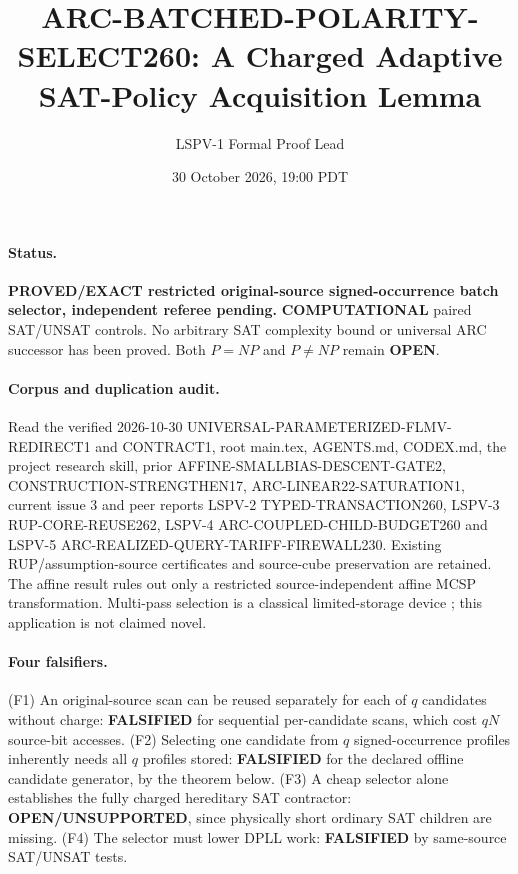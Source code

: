 \documentclass[11pt]{article}
\title{ARC-BATCHED-POLARITY-SELECT260: A Charged Adaptive SAT-Policy Acquisition Lemma}
\author{LSPV-1 Formal Proof Lead}
\date{30 October 2026, 19:00 PDT}
\begin{document}
\maketitle
\paragraph{Status.} \textbf{PROVED/EXACT restricted original-source signed-occurrence batch selector, independent referee pending.} \textbf{COMPUTATIONAL} paired SAT/UNSAT controls. No arbitrary SAT complexity bound or universal ARC successor has been proved. Both $P=NP$ and $P\ne NP$ remain \textbf{OPEN}.

\paragraph{Corpus and duplication audit.}
Read the verified 2026-10-30 UNIVERSAL-PARAMETERIZED-FLMV-REDIRECT1 and CONTRACT1, root main.tex, AGENTS.md, CODEX.md, the project research skill, prior AFFINE-SMALLBIAS-DESCENT-GATE2, CONSTRUCTION-STRENGTHEN17, ARC-LINEAR22-SATURATION1, current issue 3 and peer reports LSPV-2 TYPED-TRANSACTION260, LSPV-3 RUP-CORE-REUSE262, LSPV-4 ARC-COUPLED-CHILD-BUDGET260 and LSPV-5 ARC-REALIZED-QUERY-TARIFF-FIREWALL230. Existing RUP/assumption-source certificates and source-cube preservation are retained. The affine result rules out only a restricted source-independent affine MCSP transformation. Multi-pass selection is a classical limited-storage device \cite{munro}; this application is not claimed novel.

\paragraph{Four falsifiers.}
(F1) An original-source scan can be reused separately for each of $q$ candidates without charge: \textbf{FALSIFIED} for sequential per-candidate scans, which cost $qN$ source-bit accesses.
(F2) Selecting one candidate from $q$ signed-occurrence profiles inherently needs all $q$ profiles stored: \textbf{FALSIFIED} for the declared offline candidate generator, by the theorem below.
(F3) A cheap selector alone establishes the fully charged hereditary SAT contractor: \textbf{OPEN/UNSUPPORTED}, since physically short ordinary SAT children are missing.
(F4) The selector must lower DPLL work: \textbf{FALSIFIED} by same-source SAT/UNSAT tests.
\end{document}
